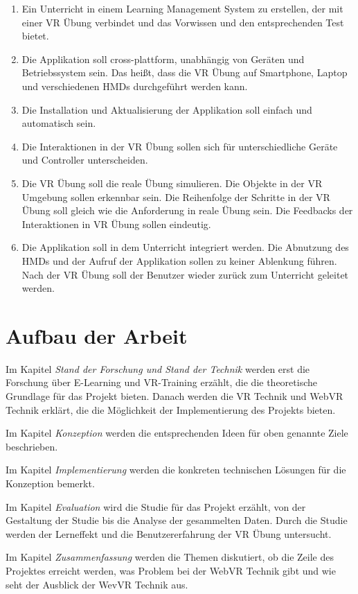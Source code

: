 \begin{enumerate}[labelsep=1ex]
	\renewcommand{\labelenumi}{\textbf{Z\theenumi.}}
	\item Ein Unterricht in einem Learning Management System zu erstellen, der mit einer VR Übung verbindet und das Vorwissen und den entsprechenden Test bietet.
	
	\item Die Applikation soll cross-plattform, unabhängig von Geräten und Betriebssystem sein. Das heißt, dass die VR Übung auf Smartphone, Laptop und verschiedenen HMDs durchgeführt werden kann.
	
	\item Die Installation und Aktualisierung der Applikation soll einfach und automatisch sein.
	
	\item Die Interaktionen in der VR Übung sollen sich für unterschiedliche Geräte und Controller unterscheiden.
	
	\item Die VR Übung soll die reale Übung simulieren. Die Objekte in der VR Umgebung sollen erkennbar sein. Die Reihenfolge der Schritte in der VR Übung soll gleich wie die Anforderung in reale Übung sein. Die Feedbacks der Interaktionen in VR Übung sollen eindeutig.
	
	\item Die Applikation soll in dem Unterricht integriert werden. Die Abnutzung des HMDs und der Aufruf der Applikation sollen zu keiner Ablenkung führen. Nach der VR Übung soll der Benutzer wieder zurück zum Unterricht geleitet werden.
	
\end{enumerate}

\section{Aufbau der Arbeit}
Im Kapitel {\em Stand der Forschung und Stand der Technik} werden erst die Forschung über E-Learning und VR-Training erzählt, die die theoretische Grundlage für das Projekt bieten. Danach werden die VR Technik und WebVR Technik erklärt, die die Möglichkeit der Implementierung des Projekts bieten.

Im Kapitel {\em Konzeption} werden die entsprechenden Ideen für oben genannte Ziele beschrieben. 

Im Kapitel {\em Implementierung} werden die konkreten technischen Lösungen für die Konzeption bemerkt.

Im Kapitel {\em Evaluation} wird die Studie für das Projekt erzählt, von der Gestaltung der Studie bis die Analyse der gesammelten Daten. Durch die Studie werden der Lerneffekt und die Benutzererfahrung der VR Übung untersucht.

Im Kapitel {\em Zusammenfassung} werden die Themen diskutiert, ob die Zeile des Projektes erreicht werden, was Problem bei der WebVR Technik gibt und wie seht der Ausblick der WevVR Technik aus.